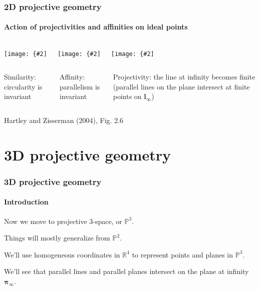 \documentclass[aspectratio=169]{beamer}
\renewcommand{\vec}[1]{\boldsymbol{#1}}
\def\Rset{\mathbb{R}}
\def\Pset{\mathbb{P}}
\newcommand{\myfig}[3]{\centerline{\texttt{[image: \{\#2]}}}
\begin{document}
\begin{frame}
\frametitle{2D projective geometry}
\framesubtitle{Action of projectivities and affinities on ideal points}

\begin{columns}
\column{1.5in}
\myfig{1.4in}{HZ-fig1-6a}{}
\column{1.5in}
\myfig{1.4in}{HZ-fig1-6b}{}
\column{1.5in}
\myfig{1.4in}{HZ-fig1-6c}{}
\end{columns}

\begin{columns}[T]
\column{1.5in}
\parbox{1.4in}{Similarity: circularity is invariant}
\column{1.5in}
\parbox{1.4in}{Affinity: parallelism is invariant}
\column{1.5in}
\parbox{1.4in}{Projectivity: the line at infinity becomes finite
  (parallel lines on the plane intersect at finite points on
  $\vec{l}_{\infty}$)}
\end{columns}

\centerline{\scriptsize Hartley and Zisserman (2004), Fig. 2.6}

\end{frame}

\section{3D projective geometry}

\begin{frame}
\frametitle{3D projective geometry}
\framesubtitle{Introduction}

Now we move to \alert{projective 3-space}, or $\Pset^3$.

\medskip

Things will mostly generalize from $\Pset^2$.

\medskip

We'll use homogeneous coordinates in $\Rset^4$ to represent points
\alert{and planes} in $\Pset^3$.

\medskip

We'll see that parallel lines and parallel planes intersect on the
\alert{plane at infinity} $\vec{\pi}_{\infty}$.

\end{frame}
\end{document}
